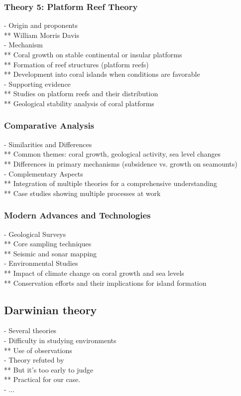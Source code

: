 \subsubsection{Theory 5: Platform Reef Theory}
- Origin and proponents \\
** William Morris Davis \\
- Mechanism \\
** Coral growth on stable continental or insular platforms \\
** Formation of reef structures (platform reefs) \\
** Development into coral islands when conditions are favorable \\
- Supporting evidence \\
** Studies on platform reefs and their distribution \\
** Geological stability analysis of coral platforms

\subsubsection{Comparative Analysis}
- Similarities and Differences \\
** Common themes: coral growth, geological activity, sea level changes \\
** Differences in primary mechanisms (subsidence vs. growth on seamounts) \\
- Complementary Aspects \\
** Integration of multiple theories for a comprehensive understanding \\
** Case studies showing multiple processes at work 

\subsubsection{Modern Advances and Technologies}
- Geological Surveys \\
** Core sampling techniques \\
** Seismic and sonar mapping \\
- Environmental Studies \\
** Impact of climate change on coral growth and sea levels \\
** Conservation efforts and their implications for island formation

\subsection{Darwinian theory}
- Several theories \\
- Difficulty in studying environments \\
** Use of observations \\
- Theory refuted by \cite{Droxler2021} \\
** But it's too early to judge \\
** Practical for our case. \\
- ...


